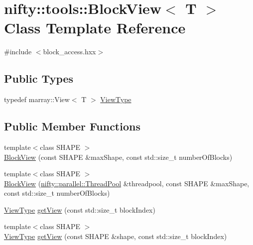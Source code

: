 \hypertarget{classnifty_1_1tools_1_1BlockView}{}\section{nifty\+:\+:tools\+:\+:Block\+View$<$ T $>$ Class Template Reference}
\label{classnifty_1_1tools_1_1BlockView}


{\ttfamily \#include $<$block\+\_\+access.\+hxx$>$}

\subsection*{Public Types}
\begin{DoxyCompactItemize}
\item 
typedef marray\+::\+View$<$ T $>$ \hyperlink{classnifty_1_1tools_1_1BlockView_a73b8633670bc34ca94859a3a37a5f84c}{View\+Type}
\end{DoxyCompactItemize}
\subsection*{Public Member Functions}
\begin{DoxyCompactItemize}
\item 
{\footnotesize template$<$class S\+H\+A\+P\+E $>$ }\\\hyperlink{classnifty_1_1tools_1_1BlockView_a1b591e8f45f3bed139be4e0c3389120b}{Block\+View} (const S\+H\+A\+P\+E \&max\+Shape, const std\+::size\+\_\+t number\+Of\+Blocks)
\item 
{\footnotesize template$<$class S\+H\+A\+P\+E $>$ }\\\hyperlink{classnifty_1_1tools_1_1BlockView_abb51114af3076842c35284562c13ca72}{Block\+View} (\hyperlink{classnifty_1_1parallel_1_1ThreadPool}{nifty\+::parallel\+::\+Thread\+Pool} \&threadpool, const S\+H\+A\+P\+E \&max\+Shape, const std\+::size\+\_\+t number\+Of\+Blocks)
\item 
\hyperlink{classnifty_1_1tools_1_1BlockView_a73b8633670bc34ca94859a3a37a5f84c}{View\+Type} \hyperlink{classnifty_1_1tools_1_1BlockView_abbd30baab53cb89ded00f37214b6056d}{get\+View} (const std\+::size\+\_\+t block\+Index)
\item 
{\footnotesize template$<$class S\+H\+A\+P\+E $>$ }\\\hyperlink{classnifty_1_1tools_1_1BlockView_a73b8633670bc34ca94859a3a37a5f84c}{View\+Type} \hyperlink{classnifty_1_1tools_1_1BlockView_aa5844a6a85c4747084f64e44f1456fe7}{get\+View} (const S\+H\+A\+P\+E \&shape, const std\+::size\+\_\+t block\+Index)
\end{DoxyCompactItemize}


